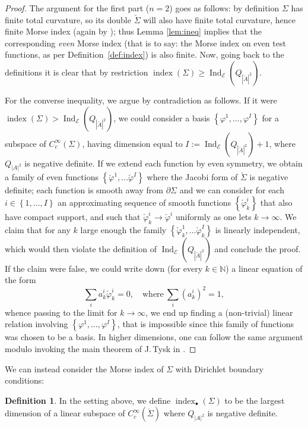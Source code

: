 \documentclass[JEP,XML,SOM,Unicode]{cedram}
\let\mathcal\mathscr
\newcommand{\sbullet}{{\scriptscriptstyle\bullet}}
\DeclareMathOperator{\indx}{index}
\DeclareMathOperator{\Ind}{Ind}
\theoremstyle{definition}
\newtheorem{definition}[thm]{Definition}
\begin{document}
\begin{proof}
The argument for the first part ($n=2$) goes as follows: by definition $\Sigma$ has finite total curvature, so its double $\check{\Sigma}$ will also have finite total curvature, hence finite Morse index (again by \cite{FC85}); thus Lemma \ref{lem:ineq} implies that the corresponding \emph{even} Morse index (that is to say: the Morse index on even test functions, as per Definition~\ref{def:index}) is also finite. Now, going back to the definitions it is clear that by restriction $\indx(\Sigma)\geq \Ind_{\mathcal{E}}(Q_{|\check{A}|^2})$.

For the converse inequality, we argue by contradiction as follows. If it were $\indx(\Sigma)> \Ind_{\mathcal{E}}(Q_{|\check{A}|^2})$, we could consider a basis $\left\{\varphi^1,\ldots, \varphi^I\right\}$ for a subspace of $C^{\infty}_c(\Sigma)$, having dimension equal to $I:=\Ind_{\mathcal{E}}(Q_{|\check{A}|^2})+1$, where $Q_{|A|^2}$ is negative definite.
If we extend each function by even symmetry, we obtain a family of even functions $\left\{\check{\varphi}^1,\ldots \check{\varphi}^I\right\}$ where the Jacobi form of $\check{\Sigma}$ is negative definite; each function is smooth away from $\partial\Sigma$ and we can consider for each $i\in\left\{1,\ldots, I\right\}$ an approximating sequence of smooth functions $\left\{\check{\varphi}^i_k\right\}$ that also have compact support, and such that $\check{\varphi}^i_k\to\check{\varphi}^i$ uniformly as one lets $k\to\infty$.
We claim that for any $k$ large enough the family $\left\{\check{\varphi}^1_k,\ldots \check{\varphi}^I_k\right\}$ is linearly independent, which would then violate the definition of $\Ind_{\mathcal{E}}(Q_{|\check{A}|^2})$ and conclude the proof.
If the claim were false, we could write down (for every $k\in\mathbb{N}$) a linear equation of the form
\[
\sum_i a^i_k \check{\varphi}^i_k=0, \quad \text{where} \ \sum_i (a^i_k)^2=1,
\]
whence passing to the limit for $k\to\infty$, we end up finding a (non-trivial) linear relation involving
$\left\{\varphi^1,\ldots, \varphi^I\right\}$, that is impossible since this family of functions was chosen to be a basis.
In higher dimensions, one can follow the same argument modulo invoking the main theorem of J.\,Tysk in \cite{T89}.
\end{proof}

We can instead consider the Morse index of $\Sigma$ with Dirichlet boundary conditions:

\begin{definition} In the setting above, we define
$\indx_{\sbullet} (\Sigma)$ to be the largest dimension of a linear subspace of $C^{\infty}_c(\mathring{\Sigma})$ where $Q_{|A|^2}$ is negative definite.
\end{definition}
\end{document}

